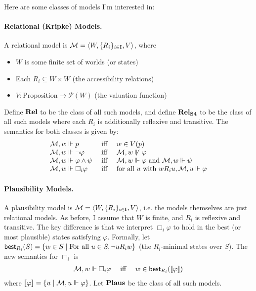 \documentclass[letterpaper]{article}
\begin{document}
Here are some classes of models I'm interested in:

\paragraph*{Relational (Kripke) Models.} A relational model is $\mathcal{M} = \langle W, \{ R_i \}_{i \in \textbf{I}}, V \rangle$, where 
\begin{itemize}
    \item $W$ is some finite set of worlds (or states)
    \item Each $R_i \subseteq W \times W$ (the accessibility relations)
    \item $V : \textrm{Proposition} \to \mathcal{P}(W)$ (the valuation function)
\end{itemize}
Define $\textrm{\textbf{Rel}}$ to be the class of all such models, and define $\textrm{\textbf{Rel}}_\textrm{\textbf{S4}}$ to be the class of all such models where each $R_i$ is additionally reflexive and transitive.  The semantics for both classes is given by:
\[
\begin{array}{lcl}
    \mathcal{M}, w \Vdash p & \mbox{ iff } & w \in V(p)\\
    \mathcal{M}, w \Vdash \neg \varphi & \mbox{ iff } & \mathcal{M}, w \not \Vdash \varphi\\
    \mathcal{M}, w \Vdash \varphi \land \psi & \mbox{ iff } & \mathcal{M}, w \Vdash \varphi \mbox{ and } \mathcal{M}, w \Vdash \psi\\
    \mathcal{M}, w \Vdash \Box_i \varphi & \mbox{ iff } & \mbox{for all } u \mbox{ with } w{R_i}u, \mathcal{M}, u \Vdash \varphi
\end{array}
\]

\paragraph*{Plausibility Models.}
A plausibility model is $\mathcal{M} = \langle W, \{ R_i \}_{i \in \textbf{I}}, V \rangle$, i.e. the models themselves are just relational models.  As before, I assume that $W$ is finite, and $R_i$ is reflexive and transitive.  The key difference is that we interpret $\Box_i \varphi$ to hold in the best (or most plausible) states satisfying $\varphi$.  Formally, let $\mathsf{best}_{R_i}{(S)} = \{ w \in S \mid \textrm{For all } u \in S, \neg u {R_i} w \}$ (the $R_i$-minimal states over $S$).  The new semantics for $\Box_i$ is
\[
\begin{array}{lcl}
    \mathcal{M}, w \Vdash \Box_i \varphi & \mbox{ iff } & w \in \mathsf{best}_{R_i}{([\![\mbox{\em $ \varphi $\/}]\!])}
\end{array}
\]
where $[\![\mbox{\em $ \varphi $\/}]\!] = \{ u \mid \mathcal{M}, u \Vdash \varphi \}$.  Let $\textrm{\textbf{Plaus}}$ be the class of all such models.
\end{document}
